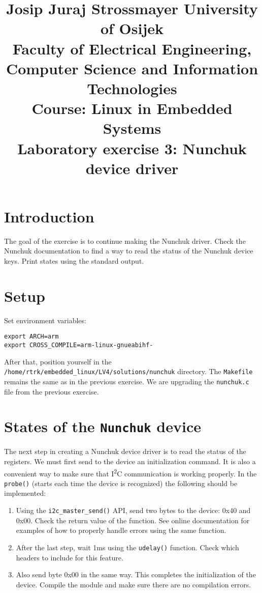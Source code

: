 \documentclass[11pt]{article}
\title{
	\Large Josip Juraj Strossmayer University of Osijek \\
	Faculty of Electrical Engineering, Computer Science and Information
	 Technologies\\
	\vspace{4cm}
	\Large Course: Linux in Embedded Systems \\
	\vspace{4cm}
	\Large \textbf{Laboratory exercise 3: Nunchuk device driver}
	}
\date{}
\begin{document}
\maketitle
\thispagestyle{empty}
\newpage

\section{Introduction}
The goal of the exercise is to continue making the Nunchuk driver.
Check the Nunchuk documentation to find a way to read the status of the Nunchuk
device keys. Print states using the standard output.

\section{Setup}
Set environment variables:
\begin{lstlisting}
export ARCH=arm
export CROSS_COMPILE=arm-linux-gnueabihf-
\end{lstlisting}
After that, position yourself in the
\texttt{/home/rtrk/embedded\_linux/LV4/solutions/nunchuk} directory. The
\texttt{Makefile} remains the same as in the previous exercise. We are upgrading
the \texttt{nunchuk.c} file from the previous exercise.

\section{States of the \texttt{Nunchuk} device}
The next step in creating a Nunchuk device driver is to read the status of the
registers. We must first send to the device an initialization command. It is
also a convenient way to make sure that I\textsuperscript{2}C communication is
working properly.
\newline
\newline
In the \texttt{probe()} (starts each time the device is recognized) the
following should be implemented:
\begin{enumerate}
	\item Using the \texttt{i2c\_master\_send()} API, send two bytes to the
		device: 0x40 and 0x00. Check the return value of the function. See
		online documentation for examples of how to properly handle errors using
		the same function.
	\item After the last step, wait 1ms using the \texttt{udelay()} function.
		Check which headers to include for this feature.
	\item Also send byte 0x00 in the same way. This completes the initialization
		of the device.
Compile the module and make sure there are no compilation errors.
\end{enumerate}
\end{document}

